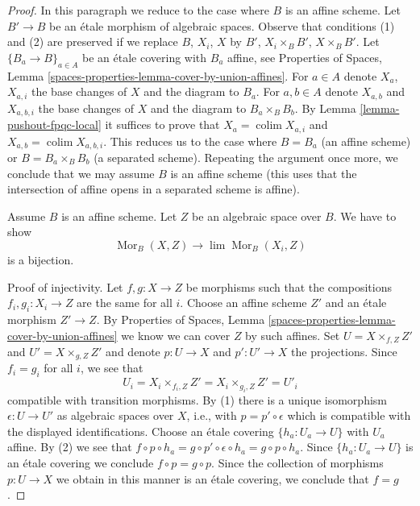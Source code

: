 \documentclass{stacks-project}
\theoremstyle{plain}
\theoremstyle{definition}
\theoremstyle{remark}
\numberwithin{equation}{subsection}
\def\lim{\mathop{\mathrm{lim}}\nolimits}
\def\colim{\mathop{\mathrm{colim}}\nolimits}
\def\Mor{\mathop{\mathrm{Mor}}\nolimits}
\begin{document}
\begin{proof}
In this paragraph we reduce to the case where $B$ is an affine scheme.
Let $B' \to B$ be an \'etale morphism of algebraic spaces.
Observe that conditions (1) and (2) are preserved if we replace
$B$, $X_i$, $X$ by $B'$, $X_i \times_B B'$, $X \times_B B'$.
Let $\{B_a \to B\}_{a \in A}$ be an \'etale covering with $B_a$
affine, see Properties of Spaces, Lemma
\ref{spaces-properties-lemma-cover-by-union-affines}.
For $a \in A$ denote $X_a$, $X_{a, i}$ the base changes of $X$ and the
diagram to $B_a$. For $a, b \in A$ denote
$X_{a, b}$ and $X_{a, b, i}$ the base changes of $X$ and the
diagram to $B_a \times_B B_b$.
By Lemma \ref{lemma-pushout-fpqc-local}
it suffices to prove that $X_a = \colim X_{a, i}$ and
$X_{a, b} = \colim X_{a, b, i}$.
This reduces us to the case where $B = B_a$ (an affine scheme) or
$B = B_a \times_B B_b$ (a separated scheme). Repeating the
argument once more, we conclude that we may assume $B$ is
an affine scheme (this uses that the intersection of affine
opens in a separated scheme is affine).

\medskip\noindent
Assume $B$ is an affine scheme. Let $Z$ be an algebraic space over $B$.
We have to show
$$
\Mor_B(X, Z) \longrightarrow \lim \Mor_B(X_i, Z)
$$
is a bijection.

\medskip\noindent
Proof of injectivity. Let $f, g : X \to Z$ be morphisms
such that the compositions $f_i, g_i : X_i \to Z$ are the same for all $i$.
Choose an affine scheme $Z'$ and an \'etale morphism $Z' \to Z$. By
Properties of Spaces, Lemma \ref{spaces-properties-lemma-cover-by-union-affines}
we know we can cover $Z$ by such affines. Set $U = X \times_{f, Z} Z'$
and $U' = X \times_{g, Z} Z'$ and denote $p : U \to X$ and $p' : U' \to X$
the projections. Since $f_i = g_i$ for all $i$, we see that
$$
U_i = X_i \times_{f_i, Z} Z' = X_i \times_{g_i, Z} Z' = U'_i
$$
compatible with transition morphisms. By (1) there is a unique isomorphism
$\epsilon : U \to U'$ as algebraic spaces over $X$, i.e., with
$p = p' \circ \epsilon$ which is compatible with
the displayed identifications. Choose an \'etale covering
$\{h_a : U_a \to U\}$ with $U_a$ affine.
By (2) we see that $f \circ p \circ h_a = g \circ p' \circ \epsilon \circ h_a =
g \circ p \circ h_a$. Since $\{h_a : U_a \to U\}$ is an \'etale covering
we conclude $f \circ p = g \circ p$.
Since the collection of morphisms $p : U \to X$ we obtain
in this manner is an \'etale covering, we conclude that $f = g$.


\end{proof}
\end{document}
